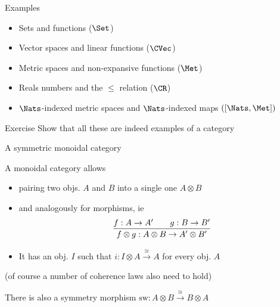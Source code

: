 \documentclass{beamer}
\begin{document}
\begin{frame}{Examples}
        \begin{itemize}
                \item Sets and functions ($\Set$) \\[10pt]
                \item Vector spaces and linear functions ($\CVec$) \\[10pt]
                \item Metric spaces and non-expansive functions ($\Met$) \\[10pt]
                \item Reals numbers and the $\leq$ relation ($\CR$)  \\[10pt]
                \item $\Nats$-indexed metric spaces and $\Nats$-indexed maps
                        $([\Nats,\Met])$
        \end{itemize}

        \pause
        \vfill
        \begin{block}{Exercise}
                Show that all these are indeed examples of a category 
        \end{block}
\end{frame}

\begin{frame}{A symmetric monoidal category}

        A monoidal category allows
        \begin{itemize}
                \item \alert{pairing} two objs. $A$ and $B$ into a single one $A
                        \otimes B$ 
                \item and analogously for morphisms, ie
                        \[
                                \infer{
                                        f \otimes g : A \otimes B \to A' \otimes B'
                                }{
                                        f : A \to A' \qquad g : B \to B'
                                }
                        \]
                \item It has an obj. $I$ such that $i : I \otimes A \stackrel{\cong}{\to} A$ for
                        every obj. $A$
        \end{itemize}

        {\scriptsize (of course a number of coherence laws also need to hold)}

        \bigskip
        There is also a \alert{symmetry} morphism $\mathrm{sw} : A \otimes B
        \stackrel{\cong}{\to} B \otimes A$
\end{frame}
\end{document}
